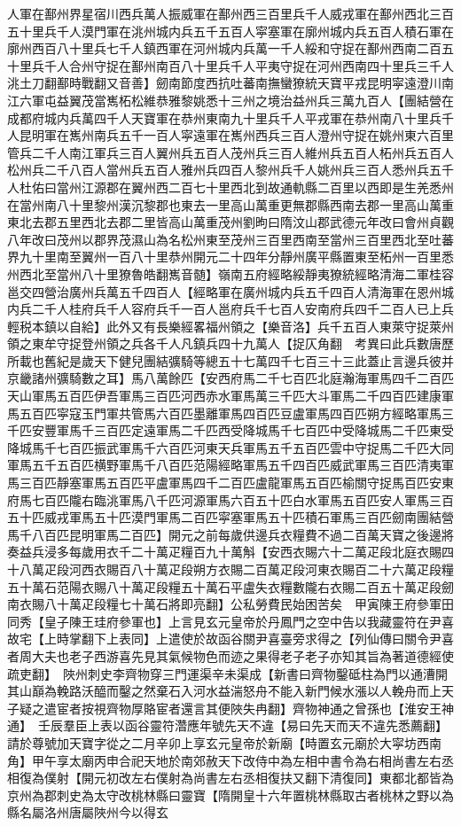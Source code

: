 人軍在鄯州界星宿川西兵萬人振威軍在鄯州西三百里兵千人威戎軍在鄯州西北三百五十里兵千人漠門軍在洮州城内兵五千五百人寜塞軍在廓州城内兵五百人積石軍在廓州西百八十里兵七千人鎮西軍在河州城内兵萬一千人綏和守捉在鄯州西南二百五十里兵千人合州守捉在鄯州南百八十里兵千人平夷守捉在河州西南四十里兵三千人洮土刀翻鄯時戰翻又音善】劒南節度西抗吐蕃南撫蠻獠統天寶平戎昆明寜遠澄川南江六軍屯益翼茂當嶲柘松維恭雅黎姚悉十三州之境治益州兵三萬九百人【團結營在成都府城内兵萬四千人天寶軍在恭州東南九十里兵千人平戎軍在恭州南八十里兵千人昆明軍在嶲州南兵五千一百人寜遠軍在嶲州西兵三百人澄州守捉在姚州東六百里管兵二千人南江軍兵三百人翼州兵五百人茂州兵三百人維州兵五百人柘州兵五百人松州兵二千八百人當州兵五百人雅州兵四百人黎州兵千人姚州兵三百人悉州兵五千人杜佑曰當州江源郡在翼州西二百七十里西北到故通軌縣二百里以西即是生羌悉州在當州南八十里黎州漢沉黎郡也東去一里高山萬重更無郡縣西南去郡一里高山萬重東北去郡五里西北去郡二里皆高山萬重茂州劉昫曰隋汶山郡武德元年改曰會州貞觀八年改曰茂州以郡界茂濕山為名松州東至茂州三百里西南至當州三百里西北至吐蕃界九十里南至翼州一百八十里恭州開元二十四年分靜州廣平縣置東至柘州一百里悉州西北至當州八十里獠魯皓翻嶲音髄】嶺南五府經略綏靜夷獠統經略清海二軍桂容邕交四營治廣州兵萬五千四百人【經略軍在廣州城内兵五千四百人清海軍在恩州城内兵二千人桂府兵千人容府兵千一百人邕府兵千七百人安南府兵四千二百人已上兵輕税本鎮以自給】此外又有長樂經畧福州領之【樂音洛】兵千五百人東萊守捉萊州領之東牟守捉登州領之兵各千人凡鎮兵四十九萬人【捉仄角翻　考異曰此兵數唐歷所載也舊紀是歲天下健兒團結彍騎等總五十七萬四千七百三十三此蓋止言邊兵彼并京畿諸州彍騎數之耳】馬八萬餘匹【安西府馬二千七百匹北庭瀚海軍馬四千二百匹天山軍馬五百匹伊吾軍馬三百匹河西赤水軍馬萬三千匹大斗軍馬二千四百匹建康軍馬五百匹寜寇玉門軍共管馬六百匹墨離軍馬四百匹豆盧軍馬四百匹朔方經略軍馬三千匹安豐軍馬千三百匹定遠軍馬二千匹西受降城馬千七百匹中受降城馬二千匹東受降城馬千七百匹振武軍馬千六百匹河東天兵軍馬五千五百匹雲中守捉馬二千匹大同軍馬五千五百匹横野軍馬千八百匹范陽經略軍馬五千四百匹威武軍馬三百匹清夷軍馬三百匹靜塞軍馬五百匹平盧軍馬四千二百匹盧龍軍馬五百匹榆關守捉馬百匹安東府馬七百匹隴右臨洮軍馬八千匹河源軍馬六百五十匹白水軍馬五百匹安人軍馬三百五十匹威戎軍馬五十匹漠門軍馬二百匹寜塞軍馬五十匹積石軍馬三百匹劒南團結營馬千八百匹昆明軍馬二百匹】開元之前每歲供邊兵衣糧費不過二百萬天寶之後邊將奏益兵浸多每歲用衣千二十萬疋糧百九十萬斛【安西衣賜六十二萬疋段北庭衣賜四十八萬疋段河西衣賜百八十萬疋段朔方衣賜二百萬疋段河東衣賜百二十六萬疋段糧五十萬石范陽衣賜八十萬疋段糧五十萬石平盧失衣糧數隴右衣賜二百五十萬疋段劒南衣賜八十萬疋段糧七十萬石將即亮翻】公私勞費民始困苦矣　甲寅陳王府參軍田同秀【皇子陳王珪府參軍也】上言見玄元皇帝於丹鳳門之空中告以我藏靈符在尹喜故宅【上時掌翻下上表同】上遣使於故函谷關尹喜臺旁求得之【列仙傳曰關令尹喜者周大夫也老子西游喜先見其氣候物色而迹之果得老子老子亦知其旨為著道德經使疏吏翻】　陜州刺史李齊物穿三門運渠辛未渠成【新書曰齊物鑿砥柱為門以通漕開其山巔為輓路沃醯而鑿之然棄石入河水益湍怒舟不能入新門候水漲以人輓舟而上天子疑之遣宦者按視齊物厚賂宦者還言其便陜失冉翻】齊物神通之曾孫也【淮安王神通】　壬辰羣臣上表以函谷靈符濳應年號先天不違【易曰先天而天不違先悉薦翻】請於尊號加天寶字從之二月辛卯上享玄元皇帝於新廟【時置玄元廟於大寜坊西南角】甲午享太廟丙申合祀天地於南郊赦天下改侍中為左相中書令為右相尚書左右丞相復為僕射【開元初改左右僕射為尚書左右丞相復扶又翻下清復同】東都北都皆為京州為郡刺史為太守改桃林縣曰靈寶【隋開皇十六年置桃林縣取古者桃林之野以為縣名屬洛州唐屬陜州今以得玄